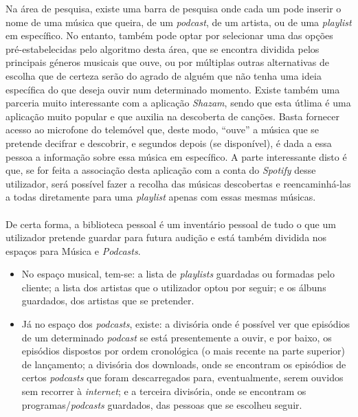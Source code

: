 \documentclass{report}
\begin{document}
Na área de pesquisa, existe uma barra de pesquisa onde cada um pode inserir o nome de uma música que queira, de um \textit{podcast}, de um artista, ou de uma \textit{playlist} em específico. No entanto, também pode optar por selecionar uma das opções pré-estabelecidas pelo algoritmo desta área, que se encontra dividida pelos principais géneros musicais que ouve, ou por múltiplas outras alternativas de escolha que de certeza serão do agrado de alguém que não tenha uma ideia específica do que deseja ouvir num determinado momento. Existe também uma parceria muito interessante com a aplicação \textit{Shazam}, sendo que esta útlima é uma aplicação muito popular e que auxilia na descoberta de canções. Basta fornecer acesso ao microfone do telemóvel que, deste modo, ``ouve'' a música que se pretende decifrar e descobrir, e segundos depois (se disponível), é dada a essa pessoa a informação sobre essa música em específico. A parte interessante disto é que, se for feita a associação desta aplicação com a conta do \textit{Spotify} desse utilizador, será possível fazer a recolha das músicas descobertas e reencaminhá-las a todas diretamente para uma \textit{playlist} apenas com essas mesmas músicas.

\paragraph{} 

De certa forma, a biblioteca pessoal é um inventário pessoal de tudo o que um utilizador pretende guardar para futura audição e está também dividida nos espaços para Música e \textit{Podcasts}.
\begin{itemize}
    \item No espaço musical, tem-se: a lista de \textit{playlists} guardadas ou formadas pelo cliente; a lista dos artistas que o utilizador optou por seguir; e os álbuns guardados, dos artistas que se pretender.
    \item Já no espaço dos \textit{podcasts}, existe: a divisória onde é possível ver que episódios de um determinado \textit{podcast} se está presentemente a ouvir, e por baixo, os episódios dispostos por ordem cronológica (o mais recente na parte superior) de lançamento; a divisória dos downloads, onde se encontram os episódios de certos \textit{podcasts} que foram descarregados para, eventualmente, serem ouvidos sem recorrer à \textit{internet}; e a terceira divisória, onde se encontram os programas/\textit{podcasts} guardados, das pessoas que se escolheu seguir.
\end{itemize}
\end{document}
